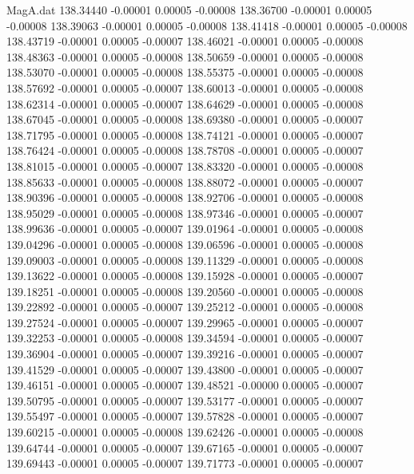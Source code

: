 \begin{filecontents}{MagA.dat}
 138.34440   -0.00001    0.00005   -0.00008
 138.36700   -0.00001    0.00005   -0.00008
 138.39063   -0.00001    0.00005   -0.00008
 138.41418   -0.00001    0.00005   -0.00008
 138.43719   -0.00001    0.00005   -0.00007
 138.46021   -0.00001    0.00005   -0.00008
 138.48363   -0.00001    0.00005   -0.00008
 138.50659   -0.00001    0.00005   -0.00008
 138.53070   -0.00001    0.00005   -0.00008
 138.55375   -0.00001    0.00005   -0.00008
 138.57692   -0.00001    0.00005   -0.00007
 138.60013   -0.00001    0.00005   -0.00008
 138.62314   -0.00001    0.00005   -0.00007
 138.64629   -0.00001    0.00005   -0.00008
 138.67045   -0.00001    0.00005   -0.00008
 138.69380   -0.00001    0.00005   -0.00007
 138.71795   -0.00001    0.00005   -0.00008
 138.74121   -0.00001    0.00005   -0.00007
 138.76424   -0.00001    0.00005   -0.00008
 138.78708   -0.00001    0.00005   -0.00007
 138.81015   -0.00001    0.00005   -0.00007
 138.83320   -0.00001    0.00005   -0.00008
 138.85633   -0.00001    0.00005   -0.00008
 138.88072   -0.00001    0.00005   -0.00007
 138.90396   -0.00001    0.00005   -0.00008
 138.92706   -0.00001    0.00005   -0.00008
 138.95029   -0.00001    0.00005   -0.00008
 138.97346   -0.00001    0.00005   -0.00007
 138.99636   -0.00001    0.00005   -0.00007
 139.01964   -0.00001    0.00005   -0.00008
 139.04296   -0.00001    0.00005   -0.00008
 139.06596   -0.00001    0.00005   -0.00008
 139.09003   -0.00001    0.00005   -0.00008
 139.11329   -0.00001    0.00005   -0.00008
 139.13622   -0.00001    0.00005   -0.00008
 139.15928   -0.00001    0.00005   -0.00007
 139.18251   -0.00001    0.00005   -0.00008
 139.20560   -0.00001    0.00005   -0.00008
 139.22892   -0.00001    0.00005   -0.00007
 139.25212   -0.00001    0.00005   -0.00008
 139.27524   -0.00001    0.00005   -0.00007
 139.29965   -0.00001    0.00005   -0.00007
 139.32253   -0.00001    0.00005   -0.00008
 139.34594   -0.00001    0.00005   -0.00007
 139.36904   -0.00001    0.00005   -0.00007
 139.39216   -0.00001    0.00005   -0.00007
 139.41529   -0.00001    0.00005   -0.00007
 139.43800   -0.00001    0.00005   -0.00007
 139.46151   -0.00001    0.00005   -0.00007
 139.48521   -0.00000    0.00005   -0.00007
 139.50795   -0.00001    0.00005   -0.00007
 139.53177   -0.00001    0.00005   -0.00007
 139.55497   -0.00001    0.00005   -0.00007
 139.57828   -0.00001    0.00005   -0.00007
 139.60215   -0.00001    0.00005   -0.00008
 139.62426   -0.00001    0.00005   -0.00008
 139.64744   -0.00001    0.00005   -0.00007
 139.67165   -0.00001    0.00005   -0.00007
 139.69443   -0.00001    0.00005   -0.00007
 139.71773   -0.00001    0.00005   -0.00007

\end{filecontents}
